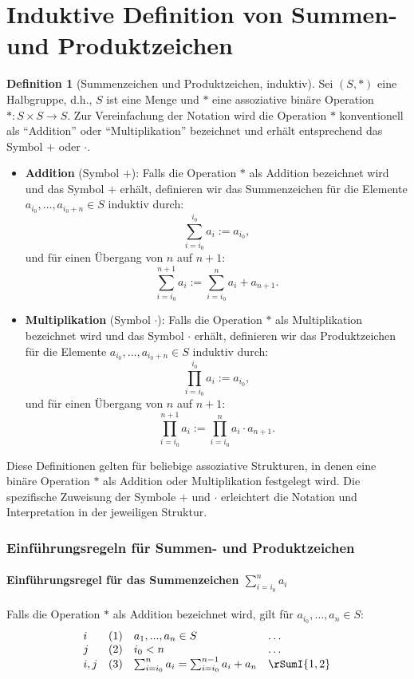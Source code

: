 \documentclass{book}
\theoremstyle{plain}
\theoremstyle{remark}
\theoremstyle{definition}
\newtheorem{definition}{Definition}[section]
\begin{document}
\section{Induktive Definition von Summen- und Produktzeichen}
\begin{definition}[Summenzeichen und Produktzeichen, induktiv]
    Sei \((S, \ast)\) eine Halbgruppe, d.h., \(S\) ist eine Menge und \(\ast\) eine assoziative binäre Operation \(\ast: S \times S \to S\). Zur Vereinfachung der Notation wird die Operation \(\ast\) konventionell als \enquote{Addition} oder \enquote{Multiplikation} bezeichnet und erhält entsprechend das Symbol \(+\) oder \(\cdot\).

    \begin{itemize}
        \item \textbf{Addition} (Symbol \(+\)): Falls die Operation \(\ast\) als Addition bezeichnet wird und das Symbol \(+\) erhält, definieren wir das Summenzeichen für die Elemente \(a_{i_0}, \dots, a_{i_0+n} \in S\) induktiv durch:
        \[
        \sum_{i=i_0}^{i_0} a_i := a_{i_0},
        \]
        und für einen Übergang von \(n\) auf \(n+1\):
        \[
        \sum_{i=i_0}^{n+1} a_i := \sum_{i=i_0}^n a_i + a_{n+1}.
        \]

        \item \textbf{Multiplikation} (Symbol \(\cdot\)): Falls die Operation \(\ast\) als Multiplikation bezeichnet wird und das Symbol \(\cdot\) erhält, definieren wir das Produktzeichen für die Elemente \(a_{i_0}, \dots, a_{i_0+n} \in S\) induktiv durch:
        \[
        \prod_{i=i_0}^{i_0} a_i := a_{i_0},
        \]
        und für einen Übergang von \(n\) auf \(n+1\):
        \[
        \prod_{i=i_0}^{n+1} a_i := \prod_{i=i_0}^n a_i \cdot a_{n+1}.
        \]
    \end{itemize}

    Diese Definitionen gelten für beliebige assoziative Strukturen, in denen eine binäre Operation \(\ast\) als Addition oder Multiplikation festgelegt wird. Die spezifische Zuweisung der Symbole \(+\) und \(\cdot\) erleichtert die Notation und Interpretation in der jeweiligen Struktur.
\end{definition}

\subsubsection{Einführungsregeln für Summen- und Produktzeichen}
\label{rule:sumIntro} \label{rule:prodIntro}

\paragraph{Einführungsregel für das Summenzeichen \(\sum_{i=i_0}^n a_i\)}
Falls die Operation \(\ast\) als Addition bezeichnet wird, gilt für \(a_{i_0}, \dots, a_n \in S\):
\[
\begin{array}{llll}
    i   & (1) & a_1,...,a_n \in S & \dots \\
    j   & (2) & i_0 < n & \dots \\
    i,j   & (3) & \sum_{i=i_0}^n a_i = \sum_{i=i_0}^{n-1} a_i + a_n & \rSumI{1,2} \\
\end{array}
\]
\end{document}
